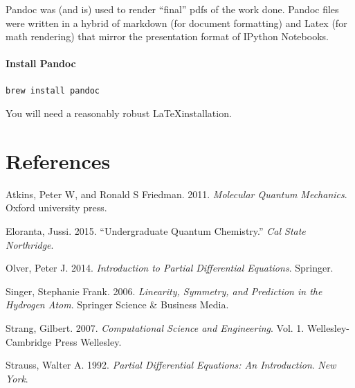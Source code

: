 \documentclass[12pt,]{book}
\let\oldparagraph\paragraph
\renewcommand{\paragraph}[1]{\oldparagraph{#1}\mbox{}}
\begin{document}
Pandoc was (and is) used to render ``final'' pdfs of the work done.
Pandoc files were written in a hybrid of markdown (for document
formatting) and Latex (for math rendering) that mirror the presentation
format of IPython Notebooks.

\paragraph{Install Pandoc}

\begin{verbatim}
brew install pandoc
\end{verbatim}

You will need a reasonably robust \LaTeX installation.

\backmatter

\section{References}\label{references}



Atkins, Peter W, and Ronald S Friedman. 2011. \emph{Molecular Quantum
Mechanics}. Oxford university press.

Eloranta, Jussi. 2015. ``Undergraduate Quantum Chemistry.'' \emph{Cal
State Northridge}.

Olver, Peter J. 2014. \emph{Introduction to Partial Differential
Equations}. Springer.

Singer, Stephanie Frank. 2006. \emph{Linearity, Symmetry, and Prediction
in the Hydrogen Atom}. Springer Science \& Business Media.

Strang, Gilbert. 2007. \emph{Computational Science and Engineering}.
Vol. 1. Wellesley-Cambridge Press Wellesley.

Strauss, Walter A. 1992. \emph{Partial Differential Equations: An
Introduction}. \emph{New York}.
\end{document}
